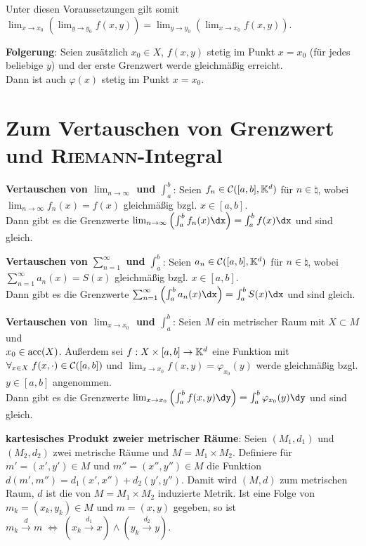 Unter diesen Voraussetzungen gilt somit
$\lim_{x \to x_0} \left(\lim_{y \to y_0} f(x, y)\right) =
\lim_{y \to y_0} \left(\lim_{x \to x_0} f(x, y)\right)$.

\textbf{Folgerung}:
Seien zusätzlich $x_0 \in X$, $f(x, y)$ stetig im Punkt
$x = x_0$ (für jedes beliebige $y$) und der erste Grenzwert werde gleichmäßig
erreicht. \\
Dann ist auch $\varphi(x)$ stetig im Punkt $x = x_0$.

\section{%
    Zum Vertauschen von Grenzwert und \textsc{Riemann}-Integral%
}

\textbf{Vertauschen von $\lim_{n \to \infty}$ und $\int_a^b$}:
Seien $f_n \in \mathcal{C}([a,b], \mathbb{K}^d)$ für $n \in \natural$, wobei \\
$\lim_{n \to \infty} f_n(x) = f(x)$ gleichmäßig bzgl. $x \in [a,b]$. \\
Dann gibt es die Grenzwerte
$\lim_{n \to \infty} \left(\int_a^b f_n(x)\dx\right) = \int_a^b f(x)\dx$
und sind gleich.

\textbf{Vertauschen von $\sum_{n=1}^\infty$ und $\int_a^b$}:
Seien $a_n \in \mathcal{C}([a,b], \mathbb{K}^d)$ für $n \in \natural$, wobei \\
$\sum_{n=1}^\infty a_n(x) = S(x)$ gleichmäßig bzgl. $x \in [a,b]$. \\
Dann gibt es die Grenzwerte
$\sum_{n=1}^\infty \left(\int_a^b a_n(x)\dx\right) = \int_a^b S(x)\dx$
und sind gleich.

\textbf{Vertauschen von $\lim_{x \to x_0}$ und $\int_a^b$}:
Seien $M$ ein metrischer Raum mit $X \subset M$ und \\
$x_0 \in \operatorname{acc}(X)$.
Außerdem sei $f: X \times [a,b] \rightarrow \mathbb{K}^d$ eine Funktion mit
$\forall_{x \in X}\; f(x, \cdot) \in \mathcal{C}([a,b])$ und
$\lim_{x \to x_0} f(x, y) = \varphi_{x_0}(y)$ werde gleichmäßig bzgl.
$y \in [a,b]$ angenommen. \\
Dann gibt es die Grenzwerte
$\lim_{x \to x_0} \left(\int_a^b f(x, y)\dy\right) =
\int_a^b \varphi_{x_0}(y)\dy$
und sind gleich.

\linie

\textbf{kartesisches Produkt zweier metrischer Räume}:
Seien $(M_1, d_1)$ und $(M_2, d_2)$ zwei metrische Räume und
$M = M_1 \times M_2$.
Definiere für $m' = (x', y') \in M$ und $m'' = (x'', y'') \in M$
die Funktion $d(m', m'') = d_1(x', x'') + d_2(y', y'')$.
Damit wird $(M, d)$ zum metrischen Raum,
$d$ ist die von $M = M_1 \times M_2$ induzierte Metrik.
Ist eine Folge von $m_k = (x_k, y_k) \in M$ und $m = (x, y)$ gegeben,
so ist $m_k \xrightarrow{d} m \;\Leftrightarrow\;
(x_k \xrightarrow{d_1} x) \land (y_k \xrightarrow{d_2} y)$.

